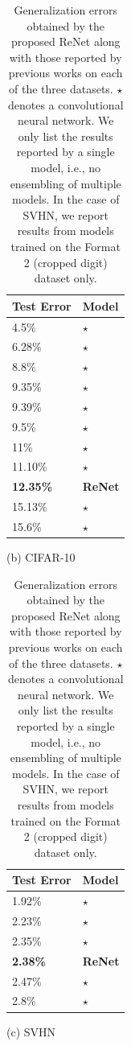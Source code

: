 \begin{table}[ht]
\begin{minipage}{0.45\textwidth}
        \begin{tabular}{l |  l}
            Test Error & Model  \\
            \hline
4.5\% & \citep{DBLP:journals/corr/Graham14a}$\star$ \\
6.28\% & \citep{DBLP:journals/corr/Graham14}$\star$ \\
8.8\% & \citep{Lin2014}$\star$ \\
9.35\% & \citep{Goodfellow2013}$\star$ \\
9.39\% & \citep{DBLP:journals/corr/SpringenbergR13}$\star$ \\
9.5\% & \citep{DBLP:conf/nips/SnoekLA12}$\star$ \\
11\% & \citep{Krizhevsky-2012}$\star$ \\
11.10\% & \citep{DBLP:conf/icml/WanZZLF13}$\star$ \\
\bf{12.35\%} & \bf{ReNet} \\
15.13\% & \citep{DBLP:journals/corr/abs-1301-3557}$\star$ \\
15.6\% & \citep{DBLP:journals/corr/abs-1207-0580}$\star$ \\
        \end{tabular}

        \vspace{2mm}
        (b) CIFAR-10
    \end{minipage}

    \vspace{4mm}
    \begin{minipage}{0.45\textwidth}
        \centering
        \begin{tabular}{l |  l}
            Test Error & Model  \\
            \hline
1.92\% & \citep{DBLP:journals/corr/LeeXGZT14}$\star$ \\
2.23\% & \citep{DBLP:conf/icml/WanZZLF13}$\star$ \\
2.35\% & \citep{Lin2014}$\star$ \\
\bf{2.38\%} & \bf{ReNet} \\
2.47\% & \citep{Goodfellow2013}$\star$ \\
2.8\% & \citep{DBLP:journals/corr/abs-1301-3557}$\star$ \\
        \end{tabular}

        \vspace{2mm}
        (c) SVHN
    \end{minipage}
    \hfill
    \begin{minipage}{0.45\textwidth}
        \caption{Generalization errors obtained by the
            proposed ReNet along with those reported by previous works
            on each of the three datasets. $\star$ denotes a
            convolutional neural network. We only list the results reported by a single
            model, i.e., no ensembling of multiple models.
            In the case of SVHN, we report results from models trained on
            the Format 2 (cropped digit) dataset only.}
        \label{tbl:result}
    \end{minipage}
\end{table}

